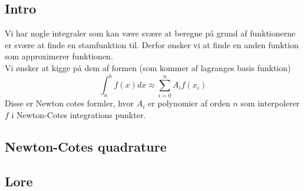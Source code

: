 \documentclass[11pt,a4paper]{article}
\begin{document}
\subsection*{Intro}
Vi har nogle integraler som kan være svære at beregne på grund af funktionerne er svære at finde en stamfunktion til. Derfor ønsker vi at finde en anden funktion som  approximerer funktionen.\\
Vi ønsker at kigge på dem af formen (som kommer af lagranges basis funktion)
$$
\int_a^b f(x)dx\approx \sum_{i=0}^n A_if(x_i)
$$
Disse er Newton cotes formler, hvor $A_i$ er polynomier af orden $n$ som interpolerer $f$ i Newton-Cotes integrations punkter.

\subsection*{Newton-Cotes quadrature}


\subsection*{Lore}
\end{document}
